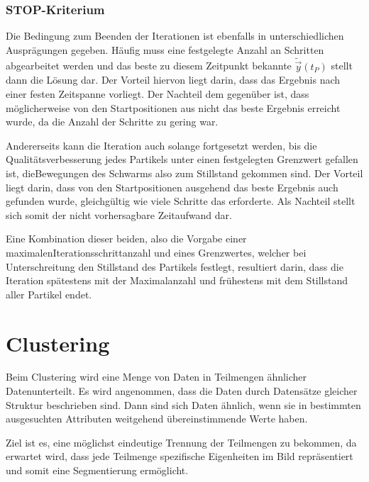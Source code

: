 \subsubsection{STOP-Kriterium}\label{PSO_IterStop}
  Die Bedingung zum Beenden der Iterationen ist ebenfalls in unterschiedlichen Ausprägungen gegeben. Häufig muss eine festgelegte Anzahl an Schritten abgearbeitet werden und das beste zu diesem Zeitpunkt bekannte $\tilde{\vec{y}}(t_P)$ stellt dann die Lösung dar. Der Vorteil hiervon liegt darin, dass das Ergebnis nach einer festen Zeitspanne vorliegt. Der Nachteil dem gegenüber ist, dass möglicherweise von den Startpositionen aus nicht das beste Ergebnis erreicht wurde, da die Anzahl der Schritte zu gering war.

  Andererseits kann die Iteration auch solange fortgesetzt werden, bis die Qualitäts\-verbesserung jedes Partikels unter einen festgelegten Grenzwert gefallen ist, die\linebreak Bewegungen des Schwarms also zum Stillstand gekommen sind. Der Vorteil liegt darin, dass von den Startpositionen ausgehend das beste Ergebnis auch gefunden wurde, gleichgültig wie viele Schritte das erforderte. Als Nachteil stellt sich somit der nicht vorhersagbare Zeitaufwand dar.

  Eine Kombination dieser beiden, also die Vorgabe einer maximalen\linebreak Iterationsschrittanzahl und eines Grenzwertes, welcher bei Unterschreitung den Stillstand des Partikels festlegt, resultiert darin, dass die Iteration spätestens mit der Maximalanzahl und frühestens mit dem Stillstand aller Partikel endet.

\section{Clustering}
  \glqq Beim Clustering wird eine Menge von Daten in Teilmengen ähnlicher Daten\linebreak unterteilt. Es wird angenommen, dass die Daten durch Datensätze gleicher Struktur beschrieben sind. Dann sind sich Daten ähnlich, wenn sie in bestimmten ausgesuchten Attributen weitgehend übereinstimmende Werte haben.\grqq\space\cite{DataMining2007}

  Ziel ist es, eine möglichst eindeutige Trennung der Teilmengen zu bekommen, da erwartet wird, dass jede Teilmenge spezifische Eigenheiten im Bild repräsentiert und somit eine Segmentierung ermöglicht. \cite{Jaehne2002}

